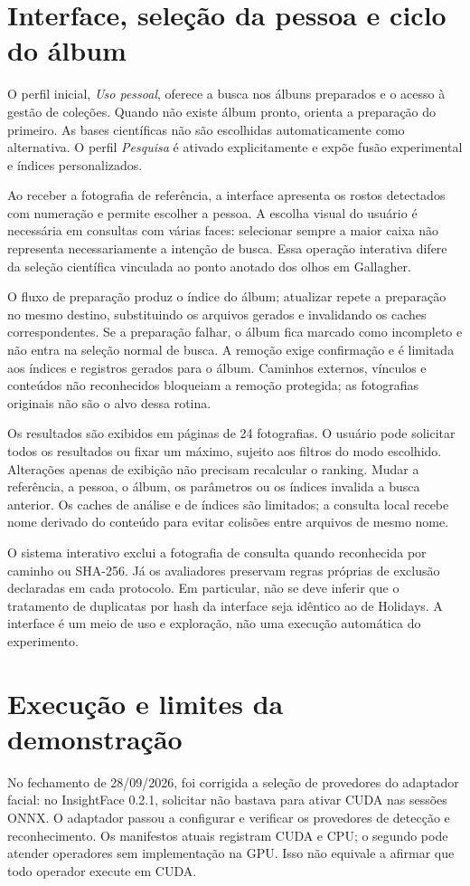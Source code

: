 \section{Interface, seleção da pessoa e ciclo do álbum}
O perfil inicial, \emph{Uso pessoal}, oferece a busca nos álbuns preparados e o acesso à gestão de coleções. Quando não existe álbum pronto, orienta a preparação do primeiro. As bases científicas não são escolhidas automaticamente como alternativa. O perfil \emph{Pesquisa} é ativado explicitamente e expõe fusão experimental e índices personalizados.

Ao receber a fotografia de referência, a interface apresenta os rostos detectados com numeração e permite escolher a pessoa. A escolha visual do usuário é necessária em consultas com várias faces: selecionar sempre a maior caixa não representa necessariamente a intenção de busca. Essa operação interativa difere da seleção científica vinculada ao ponto anotado dos olhos em Gallagher.

O fluxo de preparação produz o índice do álbum; atualizar repete a preparação no mesmo destino, substituindo os arquivos gerados e invalidando os caches correspondentes. Se a preparação falhar, o álbum fica marcado como incompleto e não entra na seleção normal de busca. A remoção exige confirmação e é limitada aos índices e registros gerados para o álbum. Caminhos externos, vínculos e conteúdos não reconhecidos bloqueiam a remoção protegida; as fotografias originais não são o alvo dessa rotina.

Os resultados são exibidos em páginas de 24 fotografias. O usuário pode solicitar todos os resultados ou fixar um máximo, sujeito aos filtros do modo escolhido. Alterações apenas de exibição não precisam recalcular o ranking. Mudar a referência, a pessoa, o álbum, os parâmetros ou os índices invalida a busca anterior. Os caches de análise e de índices são limitados; a consulta local recebe nome derivado do conteúdo para evitar colisões entre arquivos de mesmo nome.

O sistema interativo exclui a fotografia de consulta quando reconhecida por caminho ou SHA-256. Já os avaliadores preservam regras próprias de exclusão declaradas em cada protocolo. Em particular, não se deve inferir que o tratamento de duplicatas por hash da interface seja idêntico ao de Holidays. A interface é um meio de uso e exploração, não uma execução automática do experimento.

\section{Execução e limites da demonstração}
No fechamento de 28/09/2026, foi corrigida a seleção de provedores do adaptador facial: no InsightFace 0.2.1, solicitar  não bastava para ativar CUDA nas sessões ONNX. O adaptador passou a configurar e verificar os provedores de detecção e reconhecimento. Os manifestos atuais registram CUDA e CPU; o segundo pode atender operadores sem implementação na GPU. Isso não equivale a afirmar que todo operador execute em CUDA.

